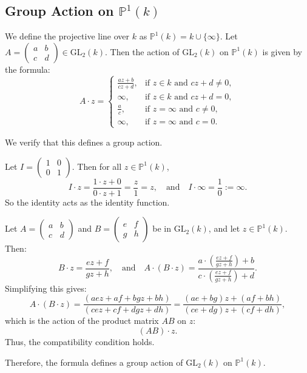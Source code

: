 \documentclass[12pt]{article}
\begin{document}
\subsection*{Group Action on \(\mathbb{P}^1(k)\)}

We define the projective line over \( k \) as \( \mathbb{P}^1(k) = k \cup \{\infty\} \). Let \( A = \begin{pmatrix} a & b \\ c & d \end{pmatrix} \in \mathrm{GL}_2(k) \). Then the action of \( \mathrm{GL}_2(k) \) on \( \mathbb{P}^1(k) \) is given by the formula:
\[
A \cdot z =
\begin{cases}
\displaystyle \frac{az + b}{cz + d}, & \text{if } z \in k \text{ and } cz + d \neq 0, \\
\infty, & \text{if } z \in k \text{ and } cz + d = 0, \\
\displaystyle \frac{a}{c}, & \text{if } z = \infty \text{ and } c \neq 0, \\
\infty, & \text{if } z = \infty \text{ and } c = 0.
\end{cases}
\]

We verify that this defines a group action.

Let \( I = \begin{pmatrix} 1 & 0 \\ 0 & 1 \end{pmatrix} \). Then for all \( z \in \mathbb{P}^1(k) \),
\[
I \cdot z = \frac{1 \cdot z + 0}{0 \cdot z + 1} = \frac{z}{1} = z, \quad \text{and} \quad I \cdot \infty = \frac{1}{0} := \infty.
\]
So the identity acts as the identity function.

Let \( A = \begin{pmatrix} a & b \\ c & d \end{pmatrix} \) and \( B = \begin{pmatrix} e & f \\ g & h \end{pmatrix} \) be in \( \mathrm{GL}_2(k) \), and let \( z \in \mathbb{P}^1(k) \). Then:
\[
B \cdot z = \frac{ez + f}{gz + h}, \quad \text{and} \quad A \cdot (B \cdot z) = \frac{a \cdot \left( \frac{ez + f}{gz + h} \right) + b}{c \cdot \left( \frac{ez + f}{gz + h} \right) + d}.
\]
Simplifying this gives:
\[
A \cdot (B \cdot z) = \frac{(aez + af + bgz + bh)}{(cez + cf + dgz + dh)} = \frac{(ae + bg)z + (af + bh)}{(ce + dg)z + (cf + dh)},
\]
which is the action of the product matrix \( AB \) on \( z \):
\[
(AB) \cdot z.
\]
Thus, the compatibility condition holds.

\medskip

Therefore, the formula defines a group action of \( \mathrm{GL}_2(k) \) on \( \mathbb{P}^1(k) \).
\end{document}
